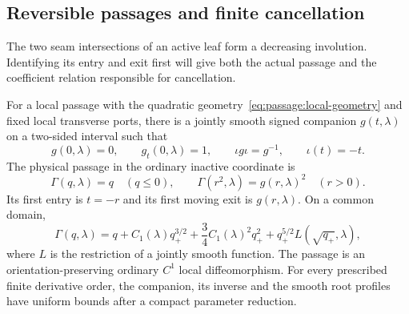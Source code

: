 \subsection{Reversible passages and finite cancellation}
\label{sec:neutral-reference}\label{sec:center-multiplicity}

The two seam intersections of an active leaf form a decreasing
involution. Identifying its entry and exit first will give both the
actual passage and the coefficient relation responsible for cancellation.

\begin{proposition}
\label{prop:quadratic-passage}\label{prop:passage:quadratic}
For a local passage with the quadratic geometry~\eqref{eq:passage:local-geometry}
and fixed local transverse ports, there is a jointly smooth
signed companion $g(t,\lambda)$ on a two-sided interval such that
\begin{equation}\label{eq:passage:reversal}
 g(0,\lambda)=0,\qquad g_t(0,\lambda)=1,\qquad
 \iota g\iota=g^{-1},\qquad \iota(t)=-t.
\end{equation}
The physical passage in the ordinary inactive coordinate is
\begin{equation}\label{eq:passage:physical}
 \Gamma(q,\lambda)=q\quad(q\leq0),\qquad
 \Gamma(r^2,\lambda)=g(r,\lambda)^2\quad(r>0).
\end{equation}
Its first entry is $t=-r$ and its first moving exit is $g(r,\lambda)$.
On a common domain,
\begin{equation}\label{eq:passage:quadratic-jet}
 \Gamma(q,\lambda)
 =q+C_1(\lambda)q_+^{3/2}
       +\frac34C_1(\lambda)^2q_+^2
       +q_+^{5/2}L(\sqrt{q_+},\lambda),
\end{equation}
where $L$ is the restriction of a jointly smooth function. The passage
is an orientation-preserving ordinary $C^1$ local diffeomorphism.
For every prescribed finite derivative order, the companion, its
inverse and the smooth root profiles have uniform bounds after a
compact parameter reduction.
\end{proposition}


